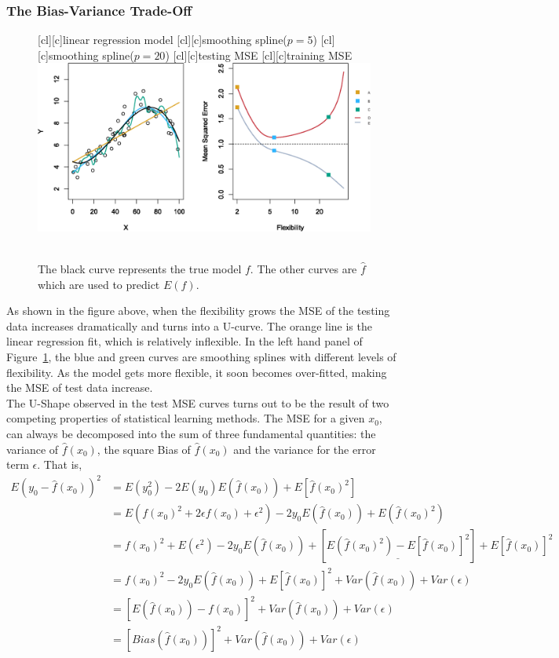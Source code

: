     \documentclass[12pt,fleqn,a4paper]{article}
\theoremstyle{definition}
\theoremstyle{plain}
\begin{document}
\subsubsection{\textbf{The Bias-Variance Trade-Off}}

\begin{figure}[H]
\centering
{}[cl][c]{\tiny linear regression model}
[cl][c]{\tiny smoothing spline($p=5$)}
[cl][c]{\tiny smoothing spline($p=20$)}
[cl][c]{\tiny testing MSE}
[cl][c]{\tiny training MSE}
\includegraphics[scale=0.7]{images//2_9.eps}
\\~\\
\caption{The black curve represents the true model $f$. The other curves are $\hat{f}$ which are used to predict $E(f)$.}\label{figure-2.9}
\end{figure}

As shown in the figure above, when the flexibility grows the MSE of the testing data increases dramatically and turns into a U-curve.
The orange line is the linear regression fit, which is relatively inflexible. In the left hand panel of Figure~\ref{figure-2.9}, the blue and green curves are smoothing splines with different levels of flexibility.
As the model gets more flexible, it soon becomes over-fitted, making the MSE of test data increase. \\

The U-Shape observed in the test MSE curves turns out to be the result of two competing properties of statistical learning methods.
The MSE for a given $x_{0}$, can always be decomposed into the sum of three fundamental quantities:
the variance of $\hat{f}(x_{0})$, the square Bias of $\hat{f}(x_{0})$ and the variance for the error term $\epsilon$. That is,
\begin{align*}
E(y_{0}-\hat{f}(x_{0}))^{2} & = E(y_{0}^2)-2E(y_{0})E(\hat{f}(x_{0})) + E [\hat{f}(x_{0})^{2}] \\
& = E(f(x_{0})^2 + 2\epsilon f(x_{0})+\epsilon^{2})-2y_{0}E(\hat{f}(x_{0})) + E (\hat{f}(x_{0})^{2}) \\
& = f(x_{0})^2 + E(\epsilon^{2})-2y_{0}E(\hat{f}(x_{0})) + [\underline{E(\hat{f}(x_{0})^{2})- E [\hat{f}(x_{0})]^{2}}] + E [\hat{f}(x_{0})]^{2} \\
& = f(x_{0})^2-2y_{0}E(\hat{f}(x_{0}))+ E [\hat{f}(x_{0})]^{2} + Var(\hat{f}(x_{0}))+Var(\epsilon) \\
& = [E(\hat{f}(x_{0}))-f(x_{0})]^{2}+ Var(\hat{f}(x_{0}))+Var(\epsilon) \\
& = [Bias(\hat{f}(x_{0}))]^{2}+ Var(\hat{f}(x_{0}))+Var(\epsilon)
\end{align*}
\end{document}
